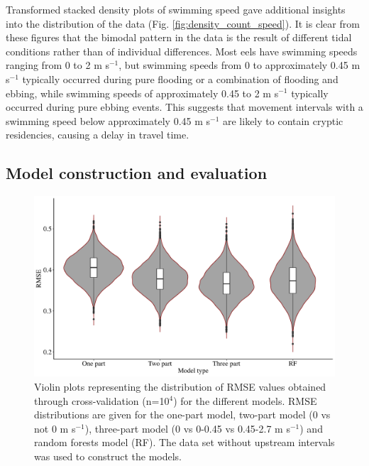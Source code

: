 \documentclass[preprint,12pt,authoryear]{elsarticle}
\begin{document}
Transformed stacked density plots of swimming speed gave additional insights into the distribution of the data (Fig. \ref{fig:density_count_speed}). It is clear from these figures that the bimodal pattern in the data is the result of different tidal conditions rather than of individual differences. Most eels have swimming speeds ranging from 0 to 2 m s$^{-1}$, but swimming speeds from 0 to approximately 0.45 m s$^{-1}$ typically occurred during pure flooding or a combination of flooding and ebbing, while swimming speeds of approximately 0.45 to 2 m s$^{-1}$ typically occurred during pure ebbing events. This suggests that movement intervals with a swimming speed below approximately 0.45 m s$^{-1}$ are likely to contain cryptic residencies, causing a delay in travel time. 

\subsection{Model construction and evaluation}
\label{sect:results:modelconstruct}



\begin{figure}[h!]
  \centering\includegraphics[scale=0.5]{violinRMSE.pdf}
  \caption{Violin plots representing the distribution of RMSE values obtained through cross-validation (n=10$^{4}$) for the different models. RMSE distributions are given for the one-part model, two-part model (0 vs not 0 m s$^{-1}$), three-part model (0 vs 0-0.45 vs 0.45-2.7 m s$^{-1}$) and random forests model (RF). The data set without upstream intervals was used to construct the models.}
  \label{fig:violinRMSE}
\end{figure}
\end{document}
